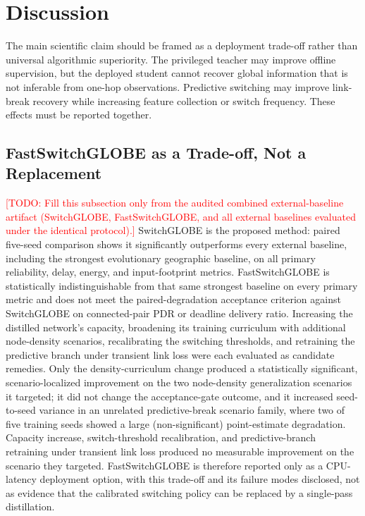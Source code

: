 \documentclass[preprint,12pt]{elsarticle}
\newcommand{\method}{SwitchGLOBE}
\newcommand{\fastmethod}{FastSwitchGLOBE}
\newcommand{\todo}[1]{\textcolor{red}{[TODO: #1]}}
\begin{document}
\section{Discussion}
\label{sec:discussion}

The main scientific claim should be framed as a deployment trade-off rather than universal algorithmic superiority. The privileged teacher may improve offline supervision, but the deployed student cannot recover global information that is not inferable from one-hop observations. Predictive switching may improve link-break recovery while increasing feature collection or switch frequency. These effects must be reported together.

\subsection{FastSwitchGLOBE as a Trade-off, Not a Replacement}

\todo{Fill this subsection only from the audited combined external-baseline artifact (\method{}, \fastmethod{}, and all external baselines evaluated under the identical protocol).} \method{} is the proposed method: paired five-seed comparison shows it significantly outperforms every external baseline, including the strongest evolutionary geographic baseline, on all primary reliability, delay, energy, and input-footprint metrics. \fastmethod{} is statistically indistinguishable from that same strongest baseline on every primary metric and does not meet the paired-degradation acceptance criterion against \method{} on connected-pair PDR or deadline delivery ratio. Increasing the distilled network's capacity, broadening its training curriculum with additional node-density scenarios, recalibrating the switching thresholds, and retraining the predictive branch under transient link loss were each evaluated as candidate remedies. Only the density-curriculum change produced a statistically significant, scenario-localized improvement on the two node-density generalization scenarios it targeted; it did not change the acceptance-gate outcome, and it increased seed-to-seed variance in an unrelated predictive-break scenario family, where two of five training seeds showed a large (non-significant) point-estimate degradation. Capacity increase, switch-threshold recalibration, and predictive-branch retraining under transient link loss produced no measurable improvement on the scenario they targeted. \fastmethod{} is therefore reported only as a CPU-latency deployment option, with this trade-off and its failure modes disclosed, not as evidence that the calibrated switching policy can be replaced by a single-pass distillation.
\end{document}
